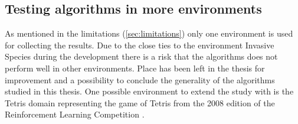 \subsection{Testing algorithms in more environments }
As mentioned in the limitations (\ref{sec:limitations}) only one environment is used for collecting the results. Due to the close ties to the environment Invasive Species during the development there is a risk that the algorithms does not perform well in other environments. Place has been left in the thesis for improvement and a possibility to conclude the generality of the algorithms studied in this thesis. One possible environment to extend the study with is the Tetris domain representing the game of Tetris from the 2008 edition of the Reinforcement Learning Competition \parencite{whiteson2010reinforcement}.  
